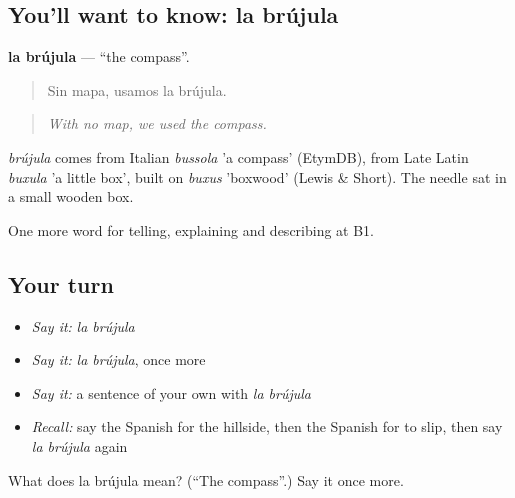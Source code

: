 \subsection*{You'll want to know: la brújula}
\textbf{la brújula} — \textquotedblleft{}the compass\textquotedblright{}.

\begin{quote}
Sin mapa, usamos la brújula.
\end{quote}

\begin{quote}
\emph{With no map, we used the compass.}
\end{quote}

\begin{cousinweb}
\emph{brújula} comes from Italian \emph{bussola} 'a compass' (EtymDB), from Late Latin \emph{buxula} 'a little box', built on \emph{buxus} 'boxwood' (Lewis \& Short). The needle sat in a small wooden box.
\end{cousinweb}

\begin{grammarlens}[title={What you've built}]
One more word for telling, explaining and describing at B1.
\end{grammarlens}

\subsection*{Your turn}
\begin{itemize}
\raggedright
  \item \emph{Say it:} \emph{la brújula}
  \item \emph{Say it:} \emph{la brújula}, once more
  \item \emph{Say it:} a sentence of your own with \emph{la brújula}
  \item \emph{Recall:} say the Spanish for the hillside, then the Spanish for to slip, then say \emph{la brújula} again
\end{itemize}

\begin{tcolorbox}[breakable,colback=teal!4,colframe=teal!35!black,title={Before you move on}]
What does la brújula mean? (\textquotedblleft{}The compass\textquotedblright{}.) Say it once more.
\end{tcolorbox}
